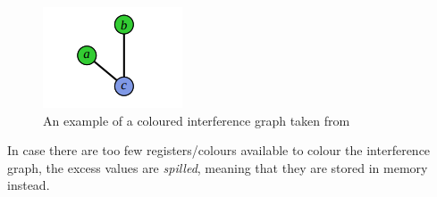 \begin{figure}[ht]
  \centering
  \includegraphics[scale=0.5]{Graphics/interferencegraph.png}
  \caption{An example of a coloured interference graph taken from \cite{ITU_liveness} }
  \label{fig:interferencegraph}
\end{figure}

In case there are too few registers/colours available to colour the interference graph, the excess values are \emph{spilled}, meaning that they are stored in memory instead.

